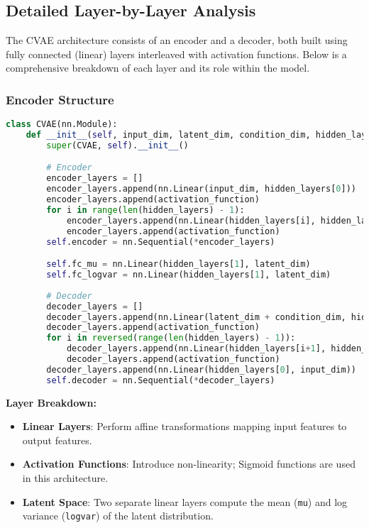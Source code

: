 \documentclass[10pt]{article}
\begin{document}
\subsection{Detailed Layer-by-Layer Analysis}
The CVAE architecture consists of an encoder and a decoder, both built using fully connected (linear) layers interleaved with activation functions. Below is a comprehensive breakdown of each layer and its role within the model.

\subsubsection{Encoder Structure}
\begin{lstlisting}[language=Python, caption=Encoder Definition]
class CVAE(nn.Module):
    def __init__(self, input_dim, latent_dim, condition_dim, hidden_layers, activation_function):
        super(CVAE, self).__init__()

        # Encoder
        encoder_layers = []
        encoder_layers.append(nn.Linear(input_dim, hidden_layers[0]))
        encoder_layers.append(activation_function)
        for i in range(len(hidden_layers) - 1):
            encoder_layers.append(nn.Linear(hidden_layers[i], hidden_layers[i+1]))
            encoder_layers.append(activation_function)
        self.encoder = nn.Sequential(*encoder_layers)

        self.fc_mu = nn.Linear(hidden_layers[1], latent_dim)
        self.fc_logvar = nn.Linear(hidden_layers[1], latent_dim)
        
        # Decoder
        decoder_layers = []
        decoder_layers.append(nn.Linear(latent_dim + condition_dim, hidden_layers[1]))
        decoder_layers.append(activation_function)
        for i in reversed(range(len(hidden_layers) - 1)):
            decoder_layers.append(nn.Linear(hidden_layers[i+1], hidden_layers[i]))
            decoder_layers.append(activation_function)
        decoder_layers.append(nn.Linear(hidden_layers[0], input_dim))
        self.decoder = nn.Sequential(*decoder_layers)
\end{lstlisting}

\textbf{Layer Breakdown:}
\begin{itemize}
    \item \textbf{Linear Layers}: Perform affine transformations mapping input features to output features.
    \item \textbf{Activation Functions}: Introduce non-linearity; Sigmoid functions are used in this architecture.
    \item \textbf{Latent Space}: Two separate linear layers compute the mean (\texttt{mu}) and log variance (\texttt{logvar}) of the latent distribution.
\end{itemize}
\end{document}

